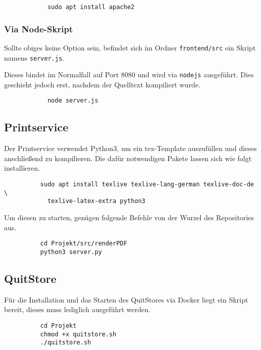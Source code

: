 \documentclass[a4paper,11pt,oneside, titlepage]{article}
\begin{document}
          \begin{lstlisting}
            sudo apt install apache2 \end{lstlisting}

				\subsubsection{Via Node-Skript}

          Sollte obiges keine Option sein, befindet sich im Ordner \verb+frontend/src+ ein Skript
          namens \verb+server.js+.

          Dieses bindet im Normalfall auf Port 8080 und wird via \verb+nodejs+ ausgeführt. Dies geschieht
          jedoch erst, nachdem der Quelltext kompiliert wurde.

          \begin{lstlisting}
            node server.js \end{lstlisting}

      \subsection{Printservice}

        Der Printservice verwendet Python3, um ein tex-Template auszufüllen und dieses anschließend
        zu kompilieren. Die dafür notwendigen Pakete lassen sich wie folgt installieren.

        \begin{lstlisting}
          sudo apt install texlive texlive-lang-german texlive-doc-de \
            texlive-latex-extra python3 \end{lstlisting}

        Um diesen zu starten, genügen folgende Befehle von der Wurzel des Repositories aus.

        \begin{lstlisting}
          cd Projekt/src/renderPDF
          python3 server.py \end{lstlisting}

      \subsection{QuitStore}

        Für die Installation und das Starten des QuitStores via Docker liegt ein Skript bereit,
        dieses muss lediglich ausgeführt werden.

        \begin{lstlisting}
          cd Projekt
          chmod +x quitstore.sh
          ./quitstore.sh \end{lstlisting}
\end{document}
